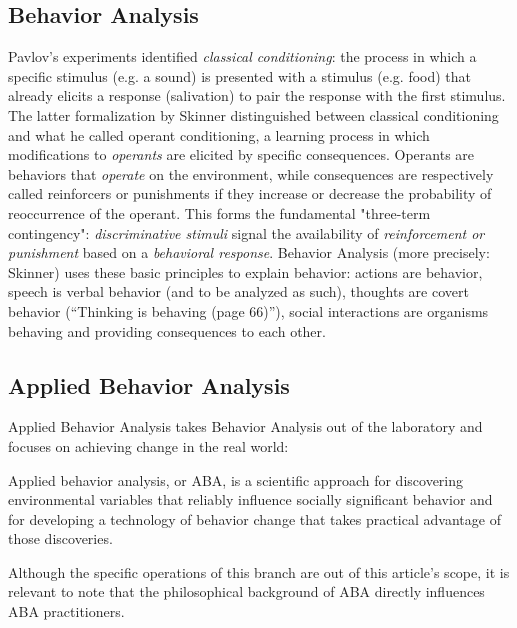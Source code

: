 \documentclass[letterpaper,11pt,twocolumn]{article}
\begin{document}
\subsection*{Behavior Analysis}
Pavlov's experiments identified \textit{classical conditioning}: the process in which a specific stimulus (e.g. a sound) is presented with a stimulus (e.g. food) that already elicits a response (salivation) to pair the response with the first stimulus\cite{iClassicalConditioning2023}. The latter formalization by Skinner distinguished between classical conditioning and what he called operant conditioning, a learning process in which modifications to \textit{operants} are elicited by specific consequences. Operants are behaviors that \textit{operate} on the environment, while consequences are respectively called reinforcers or punishments if they increase or decrease the probability of reoccurrence of the operant. This forms the fundamental "three-term contingency": \textit{discriminative stimuli} signal the availability of \textit{reinforcement or punishment} based on a \textit{behavioral response}. Behavior Analysis (more precisely: Skinner) uses these basic principles to explain behavior: actions are behavior, speech is verbal behavior (and to be analyzed as such), thoughts are covert behavior (\enquote{Thinking is behaving (page 66)}\cite{skinnerBehaviorism1976}), social interactions are organisms behaving and providing consequences to each other.

\subsection*{Applied Behavior Analysis}
Applied Behavior Analysis takes Behavior Analysis out of the laboratory and focuses on achieving change in the real world:
\begin{displayquote}
    Applied behavior analysis, or ABA, is a scientific approach for discovering environmental variables that reliably influence socially significant behavior and for developing a technology of behavior change that takes practical advantage of those discoveries.
    \cite{cooperAppliedBehaviorAnalysis2020}
\end{displayquote}
Although the specific operations of this branch are out of this article's scope, it is relevant to note that the philosophical background of ABA directly influences ABA practitioners.
\end{document}
